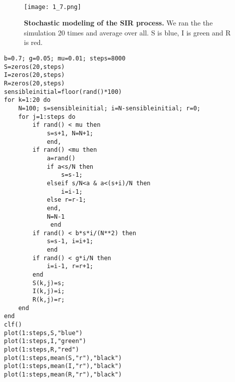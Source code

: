 \documentclass{article}
\begin{document}
\

\begin{figure}[H]
	  \centering
  	\texttt{[image: 1\_7.png]}
  	\caption{\textbf{Stochastic modeling of the SIR process.} We ran the the simulation 20 times and average over all. S is blue, I is green and R is red.}
	\end{figure}
\begin{lstlisting}
b=0.7; g=0.05; mu=0.01; steps=8000
S=zeros(20,steps)
I=zeros(20,steps)
R=zeros(20,steps)
sensibleinitial=floor(rand()*100)
for k=1:20 do
    N=100; s=sensibleinitial; i=N-sensibleinitial; r=0;
    for j=1:steps do
        if rand() < mu then 
            s=s+1, N=N+1; 
            end,
        if rand() <mu then 
            a=rand()
            if a<s/N then 
                s=s-1;
            elseif s/N<a & a<(s+i)/N then 
                i=i-1; 
            else r=r-1;
            end,
            N=N-1
             end
        if rand() < b*s*i/(N**2) then 
            s=s-1, i=i+1; 
            end
        if rand() < g*i/N then 
            i=i-1, r=r+1; 
        end
        S(k,j)=s;
        I(k,j)=i;
        R(k,j)=r;
    end
end
clf()
plot(1:steps,S,"blue")
plot(1:steps,I,"green")
plot(1:steps,R,"red")
plot(1:steps,mean(S,"r"),"black")
plot(1:steps,mean(I,"r"),"black")
plot(1:steps,mean(R,"r"),"black")

\end{lstlisting}
\end{document}
